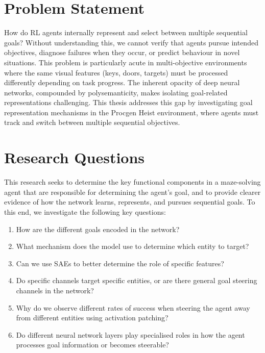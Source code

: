 \section{Problem Statement}\label{sec:problem}
How do RL agents internally represent and select between multiple sequential goals? Without understanding this, we cannot verify that agents pursue intended objectives, diagnose failures when they occur, or predict behaviour in novel situations. This problem is particularly acute in multi-objective environments where the same visual features (keys, doors, targets) must be processed differently depending on task progress. The inherent opacity of deep neural networks, compounded by polysemanticity, makes isolating goal-related representations challenging. This thesis addresses this gap by investigating goal representation mechanisms in the Procgen Heist environment, where agents must track and switch between multiple sequential objectives.

\section{Research Questions}\label{sec:questions}
This research seeks to determine the key functional components in a maze-solving agent that are responsible for determining the agent's goal, and to provide clearer evidence of how the network learns, represents, and pursues sequential goals. To this end, we investigate the following key questions:
\begin{enumerate}
    \item[\textbf{RQ1:}] How are the different goals encoded in the network?
    \item[\textbf{RQ2:}] What mechanism does the model use to determine which entity to target?
    \item[\textbf{RQ3:}] Can we use SAEs to better determine the role of specific features?
    \item[\textbf{RQ4:}] Do specific channels target specific entities, or are there general goal steering channels in the network?
    \item[\textbf{RQ5:}] Why do we observe different rates of success when steering the agent away from different entities using activation patching?
    \item[\textbf{RQ6:}] Do different neural network layers play specialised roles in how the agent processes goal information or becomes steerable?
\end{enumerate}



